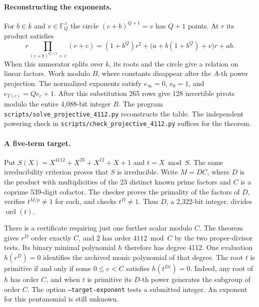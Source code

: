 \documentclass[11pt]{article}
\newcommand{\ord}{\operatorname{ord}}
\begin{document}
\paragraph{Reconstructing the exponents.}
For \(b\in k\) and \(v\in\mathbb F_Q^\times\) the circle
\((c+b)^{Q+1}=v\) has \(Q+1\) points. At \(r\) its product satisfies
\[
 r\prod_{(c+b)^{Q+1}=v}(r+c)
 =(1+b^Q)r^2+\bigl(a+b(1+b^Q)+v\bigr)r+ab.
\]
When this numerator splits over \(k\), its roots and the circle give
a relation on linear factors. Work modulo \(B\), where constants
disappear after the \(A\)-th power projection. The normalized exponents
satisfy \(e_\infty=0\), \(e_0=1\), and \(e_{T(c)}=Qe_c+1\).
After this substitution 265 rows give 128 invertible pivots modulo
the entire 4,088-bit integer \(B\). The program
\nolinkurl{scripts/solve_projective_4112.py} reconstructs the table.
The independent powering check in
\nolinkurl{scripts/check_projective_4112.py} suffices for the theorem.

\paragraph{A five-term target.}
Put \(S(X)=X^{4112}+X^{23}+X^{12}+X+1\) and \(t=X\bmod S\).
The same irreducibility criterion proves that \(S\) is irreducible.
Write \(M=DC\), where \(D\) is the product with multiplicities of
the 23 distinct known prime factors and \(C\) is a coprime 539-digit
cofactor. The checker proves the primality of the factors of \(D\),
verifies \(t^{M/p}\ne1\) for each, and checks \(t^D\ne1\). Thus
\(D\), a 2,322-bit integer, divides \(\ord(t)\).

There is a certificate requiring just one further scalar modulo \(C\).
The theorem gives \(r^D\) order exactly \(C\), and \(2\) has order
\(4112\bmod C\) by the two proper-divisor tests. Its binary minimal
polynomial \(h\) therefore has degree 4112. One evaluation
\(h(r^D)=0\) identifies the archived monic polynomial of that
degree. The root \(t\) is primitive if and only if some
\(0\le e<C\) satisfies \(h(t^{De})=0\). Indeed, any root of \(h\)
has order \(C\), and when \(t\) is primitive its \(D\)-th power
generates the subgroup of order \(C\). The option
\texttt{--target-exponent} tests a submitted integer. An exponent
for this pentanomial is still unknown.
\end{document}
